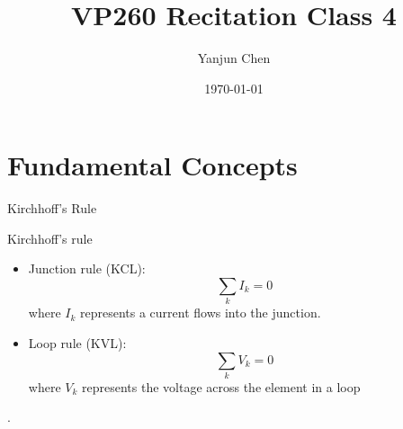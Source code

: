 \documentclass{beamer}
\title[VP260 RC]{VP260 Recitation Class 4} %
\author{Yanjun Chen} %
\institute[UM-SJTU JI] %
{
    University of Michigan - Shanghai Jiao Tong University Joint Institute\\%
\medskip
}
\date{\today} %
\begin{document}
\begin{frame}
    \titlepage %
\end{frame}


\section{Fundamental Concepts} %


\begin{frame}{Kirchhoff's Rule}
    \begin{block}{Kirchhoff's rule}
        \begin{itemize}
            \item Junction rule (KCL):
                \begin{equation}
                    \sum_k I_k = 0
                \end{equation}
                where $I_k$ represents a current flows into the junction.
            \item Loop rule (KVL):
                \begin{equation}
                    \sum_k V_k = 0
                \end{equation}
                where $V_k$ represents the voltage across the element in a loop
        \end{itemize}.
    \end{block}
\end{frame}
\end{document}
